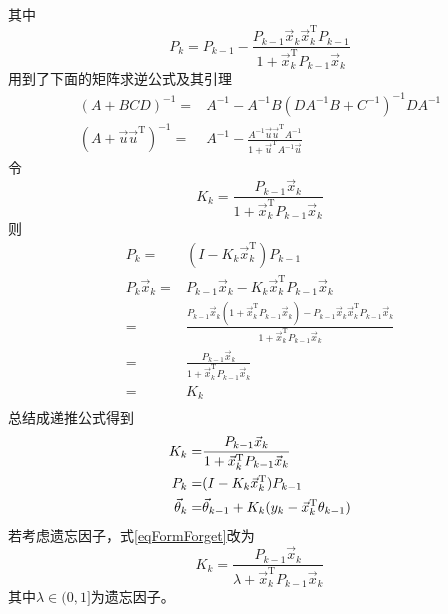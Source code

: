 其中
\begin{equation*}
    P_k = P_{k-1}-\frac{P_{k-1}\vec{x}_k\vec{x}_k^\mathrm{T}
    P_{k-1}}{1+\vec{x}_k^\mathrm{T}P_{k-1}\vec{x}_k}
\end{equation*}
用到了下面的矩阵求逆公式及其引理
\begin{align*}
    (A+BCD)^{-1} =& A^{-1}-A^{-1} B
    (DA^{-1}B+C^{-1})^{-1}DA^{-1} \\
    (A+\vec{u}\vec{u}^\text{T})^{-1} =& A^{-1}
    -\frac{A^{-1}\vec{u}\vec{u}^\text{T} A^{-1}}
    {1+\vec{u}^\text{T}A^{-1}\vec{u}}
\end{align*}
令
\begin{equation*}
    K_k = \frac{P_{k-1}\vec{x}_k}
    {1+\vec{x}_k^\mathrm{T}P_{k-1}\vec{x}_k}
\end{equation*}
则
\begin{align*}
    P_k =& (I-K_k\vec{x}_k^\mathrm{T})P_{k-1}\\
    P_k\vec{x}_k =& P_{k-1}\vec{x}_k
    -K_k\vec{x}_k^\mathrm{T}P_{k-1}\vec{x}_k \\
    =& \frac{P_{k-1}\vec{x}_k
    (1+\vec{x}_k^\mathrm{T}P_{k-1}\vec{x}_k)
    -P_{k-1}\vec{x}_k\vec{x}_k^\mathrm{T}
    P_{k-1}\vec{x}_k}
    {1+\vec{x}_k^\mathrm{T}P_{k-1}\vec{x}_k} \\
    =& \frac{P_{k-1}\vec{x}_k}
    {1+\vec{x}_k^\mathrm{T}P_{k-1}\vec{x}_k} \\
    =& K_k \\
\end{align*}
总结成递推公式得到
\begin{align}
    K_k =& \frac{P_{k-1}\vec{x}_k}{1+\vec{x}_k^\mathrm{T}
    P_{k-1}\vec{x}_k} \label{eqFormForget}\\
    P_k =& (I-K_k\vec{x}_k^\mathrm{T})P_{k-1} \notag\\
    \vec{\theta}_k =& \vec{\theta}_{k-1}
    +K_k(y_k-\vec{x}_k^\mathrm{T}\theta_{k-1}) \notag
\end{align}
若考虑遗忘因子，式\eqref{eqFormForget}改为
\begin{equation*}
    K_k = \frac{P_{k-1}\vec{x}_k}
    {\lambda+\vec{x}_k^\mathrm{T}P_{k-1}\vec{x}_k}
\end{equation*}
其中$\lambda\in(0,1]$为遗忘因子。
